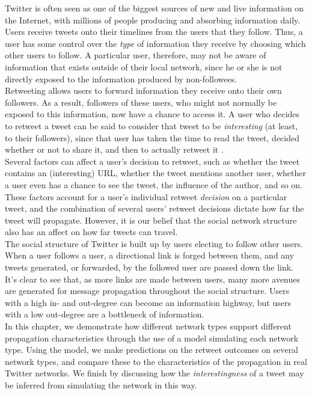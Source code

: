 Twitter is often seen as one of the biggest sources of new and live information on the Internet, with millions of people producing and absorbing information daily. Users receive tweets onto their timelines from the users that they follow. Thus, a user has some control over the \textit{type} of information they receive by choosing which other users to follow. A particular user, therefore, may not be aware of information that exists outside of their local network, since he or she is not directly exposed to the information produced by non-followees.
\\
Retweeting allows users to forward information they receive onto their own followers. As a result, followers of these users, who might not normally be exposed to this information, now have a chance to access it. A user who decides to retweet a tweet can be said to consider that tweet to be \textit{interesting} (at least, to their followers), since that user has taken the time to read the tweet, decided whether or not to share it, and then to actually retweet it \cite{uysal11}.
\\
Several factors can affect a user's decision to retweet, such as whether the tweet contains an (interesting) URL, whether the tweet mentions another user, whether a user even has a chance to see the tweet, the influence of the author, and so on. These factors account for a user's individual retweet \textit{decision} on a particular tweet, and the combination of several users' retweet decisions dictate how far the tweet will propagate. However, it is our belief that the social network structure also has an affect on how far tweets can travel.
\\
The social structure of Twitter is built up by users electing to follow other users. When a user follows a user, a directional link is forged between them, and any tweets generated, or forwarded, by the followed user are passed down the link. It's clear to see that, as more links are made between users, many more avenues are generated for message propagation throughout the social structure. Users with a high in- and out-degree can become an information highway, but users with a low out-degree are a bottleneck of information. 
\\
In this chapter, we demonstrate how different network types support different propagation characteristics through the use of a model simulating each network type. Using the model, we make predictions on the retweet outcomes on several network types, and compare these to the characteristics of the propagation in real Twitter networks. We finish by discussing how the \textit{interestingness} of a tweet may be inferred from simulating the network in this way.

